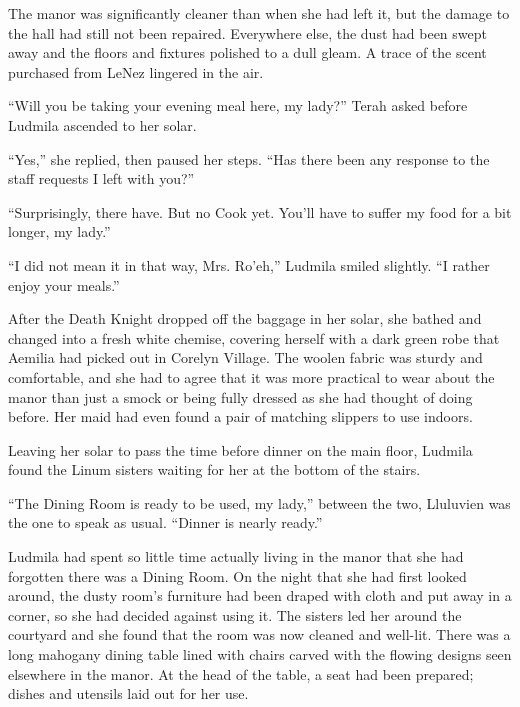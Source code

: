  

The manor was significantly cleaner than when she had left it, but the damage to the hall had still not been repaired. Everywhere else, the dust had been swept away and the floors and fixtures polished to a dull gleam. A trace of the scent purchased from LeNez lingered in the air.

 

“Will you be taking your evening meal here, my lady?” Terah asked before Ludmila ascended to her solar.

 

“Yes,” she replied, then paused her steps. “Has there been any response to the staff requests I left with you?”

 

“Surprisingly, there have. But no Cook yet. You’ll have to suffer my food for a bit longer, my lady.”

 

“I did not mean it in that way, Mrs. Ro’eh,” Ludmila smiled slightly. “I rather enjoy your meals.”

 

After the Death Knight dropped off the baggage in her solar, she bathed and changed into a fresh white chemise, covering herself with a dark green robe that Aemilia had picked out in Corelyn Village. The woolen fabric was sturdy and comfortable, and she had to agree that it was more practical to wear about the manor than just a smock or being fully dressed as she had thought of doing before. Her maid had even found a pair of matching slippers to use indoors.

 

Leaving her solar to pass the time before dinner on the main floor, Ludmila found the Linum sisters waiting for her at the bottom of the stairs.

 

“The Dining Room is ready to be used, my lady,” between the two, Lluluvien was the one to speak as usual. “Dinner is nearly ready.”

 

Ludmila had spent so little time actually living in the manor that she had forgotten there was a Dining Room. On the night that she had first looked around, the dusty room’s furniture had been draped with cloth and put away in a corner, so she had decided against using it. The sisters led her around the courtyard and she found that the room was now cleaned and well-lit. There was a long mahogany dining table lined with chairs carved with the flowing designs seen elsewhere in the manor. At the head of the table, a seat had been prepared; dishes and utensils laid out for her use.

